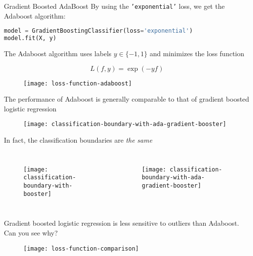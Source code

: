 %
\begin{frame}[fragile]{Gradient Boosted AdaBoost}
By using the \texttt{'exponential'} loss, we get the Adaboost algorithm:

\begin{lstlisting}[language=python]
model = GradientBoostingClassifier(loss='exponential')
model.fit(X, y)
\end{lstlisting}

\end{frame}
%
\begin{frame}
The Adaboost algorithm uses labels $y \in \{-1, 1\}$ and minimizes the loss function

$$ L(f, y) = \exp( - y f) $$

  \begin{figure}
    \texttt{[image: loss-function-adaboost]}
  \end{figure}

\end{frame}
%
\begin{frame}
The performance of Adaboost is generally comparable to that of gradient boosted logistic regression

  \begin{figure}
  
    \texttt{[image: classification-boundary-with-ada-gradient-booster]}
  \end{figure}
  
\end{frame}
%
\begin{frame}
In fact, the classification boundaries are \textit{the same}

  \begin{columns}
    \begin{figure}
      \texttt{[image: classification-boundary-with-booster]}
    \end{figure}
    \begin{figure}
      \texttt{[image: classification-boundary-with-ada-gradient-booster]}
    \end{figure}
  \end{columns}
  
\end{frame}
%
\begin{frame}
Gradient boosted logistic regression is less sensitive to outliers than Adaboost.  Can you see why?

  \begin{figure}
    \texttt{[image: loss-function-comparison]}
  \end{figure}
  
\end{frame}
